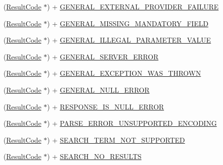 \begin{DoxyCompactItemize}
\item 
(\hyperlink{interface_result_code}{Result\+Code} $\ast$) + \hyperlink{interface_result_code_a81a5d42460c2817e7c883916ab200b40}{G\+E\+N\+E\+R\+A\+L\+\_\+\+E\+X\+T\+E\+R\+N\+A\+L\+\_\+\+P\+R\+O\+V\+I\+D\+E\+R\+\_\+\+F\+A\+I\+L\+U\+R\+E}
\item 
(\hyperlink{interface_result_code}{Result\+Code} $\ast$) + \hyperlink{interface_result_code_ac552e8bfb88e867d0f876e71077bdab1}{G\+E\+N\+E\+R\+A\+L\+\_\+\+M\+I\+S\+S\+I\+N\+G\+\_\+\+M\+A\+N\+D\+A\+T\+O\+R\+Y\+\_\+\+F\+I\+E\+L\+D}
\item 
(\hyperlink{interface_result_code}{Result\+Code} $\ast$) + \hyperlink{interface_result_code_a0cc6bf6c5cc3e5904b5b27d74fd35a7a}{G\+E\+N\+E\+R\+A\+L\+\_\+\+I\+L\+L\+E\+G\+A\+L\+\_\+\+P\+A\+R\+A\+M\+E\+T\+E\+R\+\_\+\+V\+A\+L\+U\+E}
\item 
(\hyperlink{interface_result_code}{Result\+Code} $\ast$) + \hyperlink{interface_result_code_a231c6ae257bfdc00aa8623f6de6bd9ca}{G\+E\+N\+E\+R\+A\+L\+\_\+\+S\+E\+R\+V\+E\+R\+\_\+\+E\+R\+R\+O\+R}
\item 
(\hyperlink{interface_result_code}{Result\+Code} $\ast$) + \hyperlink{interface_result_code_a02dc705f4aef04d3d2ccdb3a10349517}{G\+E\+N\+E\+R\+A\+L\+\_\+\+E\+X\+C\+E\+P\+T\+I\+O\+N\+\_\+\+W\+A\+S\+\_\+\+T\+H\+R\+O\+W\+N}
\item 
(\hyperlink{interface_result_code}{Result\+Code} $\ast$) + \hyperlink{interface_result_code_a475702e378e563e2dffff0a02f8cf7d1}{G\+E\+N\+E\+R\+A\+L\+\_\+\+N\+U\+L\+L\+\_\+\+E\+R\+R\+O\+R}
\item 
(\hyperlink{interface_result_code}{Result\+Code} $\ast$) + \hyperlink{interface_result_code_a790ea8dc3361c9b2526969255d04215a}{R\+E\+S\+P\+O\+N\+S\+E\+\_\+\+I\+S\+\_\+\+N\+U\+L\+L\+\_\+\+E\+R\+R\+O\+R}
\item 
(\hyperlink{interface_result_code}{Result\+Code} $\ast$) + \hyperlink{interface_result_code_ab842f0f0279165332093171897cb89f3}{P\+A\+R\+S\+E\+\_\+\+E\+R\+R\+O\+R\+\_\+\+U\+N\+S\+U\+P\+P\+O\+R\+T\+E\+D\+\_\+\+E\+N\+C\+O\+D\+I\+N\+G}
\item 
(\hyperlink{interface_result_code}{Result\+Code} $\ast$) + \hyperlink{interface_result_code_a1269eb237414280bc2112d495509405e}{S\+E\+A\+R\+C\+H\+\_\+\+T\+E\+R\+M\+\_\+\+N\+O\+T\+\_\+\+S\+U\+P\+P\+O\+R\+T\+E\+D}
\item 
(\hyperlink{interface_result_code}{Result\+Code} $\ast$) + \hyperlink{interface_result_code_ab8655a53168635e7e2b72efa4f1d734e}{S\+E\+A\+R\+C\+H\+\_\+\+N\+O\+\_\+\+R\+E\+S\+U\+L\+T\+S}
\item 

\end{DoxyCompactItemize}
